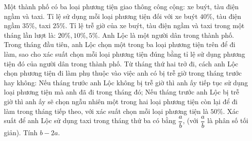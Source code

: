 \begin{bt}%
	Một thành phố có ba loại phương tiện giao thông công cộng: xe buýt, tàu điện ngầm và taxi. Tỉ lệ sử dụng mỗi loại phương tiện đối với xe buýt $40\%$, tàu điện ngầm $35\%$, taxi $25\%$. Tỉ lệ trễ giờ của xe buýt, tàu  điện ngầm và taxi trong một tháng lần lượt là: $20\%$,\,$10\%$,\,$5\%$. Anh Lộc là một người dân trong thành phố. Trong tháng đầu tiên, anh Lộc chọn một trong ba loại phương tiện trên để đi làm, sao cho xác suất chọn mỗi loại phương tiện đúng bằng tỉ lệ sử dụng phương tiện đó của người dân trong thành phố. Từ tháng thứ hai trở đi, cách anh Lộc chọn phương tiện đi làm phụ thuộc vào việc anh có bị trễ giờ trong tháng trước hay không: Nếu tháng trước anh Lộc không bị trễ giờ thì anh ấy tiếp tục sử dụng loại phương tiện mà anh đã đi trong tháng đó; Nếu tháng trước anh Lộc bị trễ giờ thì anh ấy sẽ chọn ngẫu nhiên một trong hai loại phương tiện còn lại để đi làm trong tháng tiếp theo, với xác suất chọn mỗi loại phương tiện là $50\%$. Xác suất để anh Lộc sử dụng taxi trong tháng thứ ba có bằng $\dfrac{a}{b}$, (với $\dfrac{a}{b}$ là phân số tối giản). Tính $b-2a$.
\end{bt}

